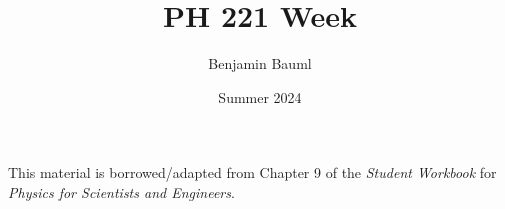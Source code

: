 \documentclass[]{article}
\title{PH 221 Week \Week}
\author{Benjamin Bauml}
\date{Summer 2024}
\newcommand{\FileDepth}{../../..}
\begin{document}
\maketitle
\begin{center}
	This material is borrowed/adapted from Chapter 9 of the \textit{Student Workbook} for \textit{Physics for Scientists and Engineers}.
\end{center}




\end{document}
